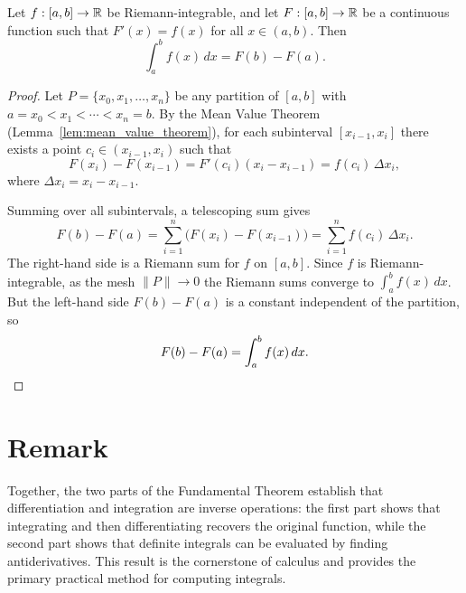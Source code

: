 \begin{theorem}
  \label{thm:ftc2}
  Let $f : [a,b] \to \mathbb{R}$ be Riemann-integrable, and let $F : [a,b] \to \mathbb{R}$ be a continuous
  function such that $F'(x) = f(x)$ for all $x \in (a,b)$. Then
  \[
    \int_a^b f(x)\,dx = F(b) - F(a).
  \]
\end{theorem}
\begin{proof}
  Let $P = \{x_0, x_1, \ldots, x_n\}$ be any partition of $[a,b]$ with
  $a = x_0 < x_1 < \cdots < x_n = b$. By the Mean Value Theorem
  (Lemma~\ref{lem:mean_value_theorem}), for each subinterval $[x_{i-1}, x_i]$ there
  exists a point $c_i \in (x_{i-1}, x_i)$ such that
  \[
    F(x_i) - F(x_{i-1}) = F'(c_i)(x_i - x_{i-1}) = f(c_i)\,\Delta x_i,
  \]
  where $\Delta x_i = x_i - x_{i-1}$.

  Summing over all subintervals, a telescoping sum gives
  \[
    F(b) - F(a) = \sum_{i=1}^n \bigl(F(x_i) - F(x_{i-1})\bigr) = \sum_{i=1}^n f(c_i)\,\Delta x_i.
  \]
  The right-hand side is a Riemann sum for $f$ on $[a,b]$. Since $f$ is Riemann-integrable,
  as the mesh $\|P\| \to 0$ the Riemann sums converge to $\int_a^b f(x)\,dx$. But the
  left-hand side $F(b) - F(a)$ is a constant independent of the partition, so
  \[
    F(b) - F(a) = \int_a^b f(x)\,dx. \qedhere
  \]
\end{proof}

\section{Remark}

Together, the two parts of the Fundamental Theorem establish that differentiation and
integration are inverse operations: the first part shows that integrating and then
differentiating recovers the original function, while the second part shows that definite
integrals can be evaluated by finding antiderivatives. This result is the cornerstone of
calculus and provides the primary practical method for computing integrals.
